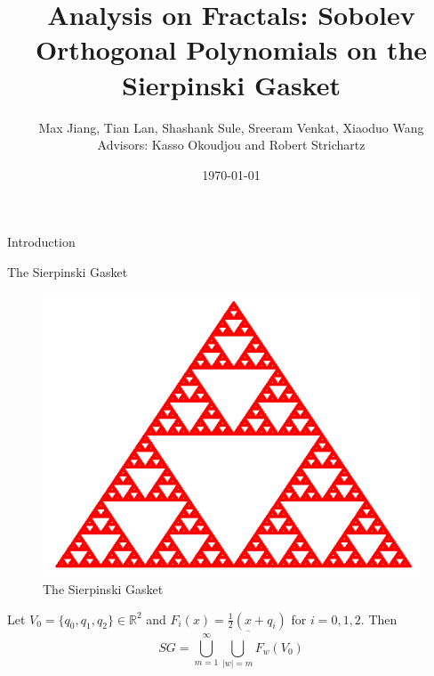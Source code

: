 \documentclass[xcolor = dvipsnames]{beamer}
\title{Analysis on Fractals: Sobolev Orthogonal Polynomials on the Sierpinski Gasket}
\author{Max Jiang, Tian Lan, Shashank Sule, Sreeram Venkat, Xiaoduo Wang\\[0.4cm]Advisors: Kasso Okoudjou and Robert Strichartz}
\institute{Cornell SPUR 2019: Analysis on Fractals}%
\date{\today}
\begin{document}
\begin{frame}
  \titlepage
\end{frame}

\begin{section}{Introduction}

\begin{frame}{The Sierpinski Gasket}
    \begin{figure}
        \centering
        \includegraphics[width=0.45\linewidth]{Final_presentation/images/SG.png}
        \caption{The Sierpinski Gasket}
    \end{figure}
    
    Let $V_0 = \{q_0, q_1, q_2\} \in \mathbb{R}^2$ and $F_i(x) = \frac{1}{2}(x+q_i)$ for $i=0,1,2$. Then $$SG = \overline{\bigcup_{m=1}^{\infty}\bigcup_{|w|=m}F_w(V_0)}$$
    

\end{frame}
\end{section}
\end{document}
